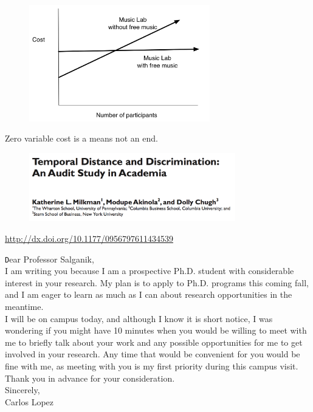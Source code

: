 \documentclass[aspectratio=169]{beamer}
\begin{document}
\begin{frame}

\begin{figure}
  \centering
  \includegraphics[width=0.7\textwidth]{figures/zero_variable_cost_experiments_musiclab}
\end{figure}

\vfill
\pause
\Large{Zero variable cost is a means not an end.}

\end{frame}
\begin{frame}

\begin{figure}
  \centering
  \includegraphics[width=0.8\textwidth]{figures/milkman_temporal_2012_title.png}
\end{figure}

\vfill
\tiny{\url{http://dx.doi.org/10.1177/0956797611434539}}

\end{frame}
\begin{frame}

{\texttt
Dear Professor Salganik,\\ 

I am writing you because I am a prospective Ph.D. student with considerable interest in your research. My plan is to apply to Ph.D. programs this coming fall, and I am eager to learn as much as I can about research opportunities in the meantime.\\

I will be on campus today, and although I know it is short notice, I was wondering if you might have 10 minutes when you would be willing to meet with me to briefly talk about your work and any possible opportunities for me to get involved in your research. Any time that would be convenient for you would be fine with me, as meeting with you is my first priority during this campus visit.\\

Thank you in advance for your consideration.\\

Sincerely,\\
Carlos Lopez
}

\end{frame}
\end{document}
